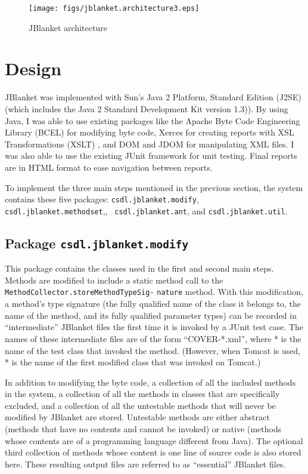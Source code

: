 \begin{figure}[htbp]
  \centering
  \texttt{[image: figs/jblanket.architecture3.eps]}
  \caption{JBlanket architecture}
  \label{fig:architecture}
\end{figure}

\section{Design}
JBlanket was implemented with Sun's Java 2 Platform, Standard Edition
(J2SE) (which includes the Java 2 Standard Development Kit version 1.3)).
By using Java, I was able to use existing packages like the Apache Byte
Code Engineering Library (BCEL) \cite{BCEL} for modifying byte code, Xerces
\cite{Xerces} for creating reports with XSL Transformations (XSLT)
\cite{XSLT}, and DOM \cite{DOM} and JDOM \cite{JDOM} for manipulating XML
files.  I was also able to use the existing JUnit framework for unit
testing.  Final reports are in HTML format to ease navigation between
reports.

To implement the three main steps mentioned in the previous section, the
system contains these five packages: {\tt csdl.jblanket.modify}, {\tt
csdl.jblanket.methodset},, {\tt
csdl.jblanket.ant}, and {\tt csdl.jblanket.util}.

\subsection{Package {\tt csdl.jblanket.modify}}
This package contains the classes used in the first and second main steps.
Methods are modified to include a static method call to the {\tt
MethodCollector.storeMethodTypeSig-} {\tt nature} method.  With this
modification, a method's type signature (the fully qualified name of the
class it belongs to, the name of the method, and its fully qualified
parameter types) can be recorded in ``intermediate'' JBlanket files the
first time it is invoked by a JUnit test case.  The names of these
intermediate files are of the form ``COVER-*.xml'', where * is the name of
the test class that invoked the method.  (However, when Tomcat is used, *
is the name of the first modified class that was invoked on Tomcat.)

In addition to modifying the byte code, a collection of all the included
methods in the system, a collection of all the methods in classes that are
specifically excluded, and a collection of all the untestable methods that
will never be modified by JBlanket are stored.  Untestable methods are
either abstract (methods that have no contents and cannot be invoked) or
native (methods whose contents are of a programming language different from
Java).  The optional third collection of methods whose content is one line
of source code is also stored here.  These resulting output files are
referred to as ``essential'' JBlanket files.

